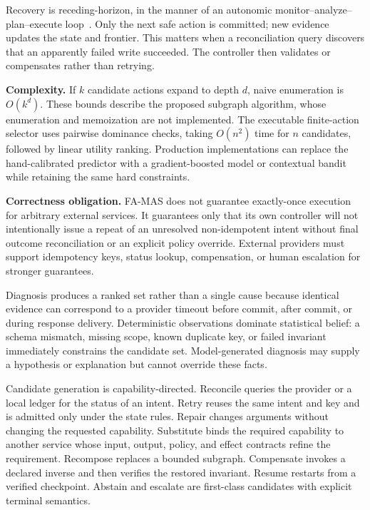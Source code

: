 \documentclass[10pt,journal,compsoc]{IEEEtran}
\newcommand{\famas}{FA-MAS}
\begin{document}
Recovery is receding-horizon, in the manner of an autonomic monitor--analyze--plan--execute loop~\cite{kephart2003autonomic}. Only the next safe action is committed; new evidence updates the state and frontier. This matters when a reconciliation query discovers that an apparently failed write succeeded. The controller then validates or compensates rather than retrying.

\textbf{Complexity.} If $k$ candidate actions expand to depth $d$, naive enumeration is $O(k^d)$. These bounds describe the proposed subgraph algorithm, whose enumeration and memoization are not implemented. The executable finite-action selector uses pairwise dominance checks, taking $O(n^2)$ time for $n$ candidates, followed by linear utility ranking. Production implementations can replace the hand-calibrated predictor with a gradient-boosted model or contextual bandit while retaining the same hard constraints.

\textbf{Correctness obligation.} \famas{} does not guarantee exactly-once execution for arbitrary external services. It guarantees only that its own controller will not intentionally issue a repeat of an unresolved non-idempotent intent without final outcome reconciliation or an explicit policy override. External providers must support idempotency keys, status lookup, compensation, or human escalation for stronger guarantees.

Diagnosis produces a ranked set rather than a single cause because identical evidence can correspond to a provider timeout before commit, after commit, or during response delivery. Deterministic observations dominate statistical belief: a schema mismatch, missing scope, known duplicate key, or failed invariant immediately constrains the candidate set. Model-generated diagnosis may supply a hypothesis or explanation but cannot override these facts.

Candidate generation is capability-directed. Reconcile queries the provider or a local ledger for the status of an intent. Retry reuses the same intent and key and is admitted only under the state rules. Repair changes arguments without changing the requested capability. Substitute binds the required capability to another service whose input, output, policy, and effect contracts refine the requirement. Recompose replaces a bounded subgraph. Compensate invokes a declared inverse and then verifies the restored invariant. Resume restarts from a verified checkpoint. Abstain and escalate are first-class candidates with explicit terminal semantics.
\end{document}
